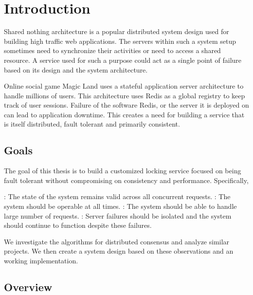\chapter{Introduction}
\label{chapter:introduction}

Shared nothing architecture%
 \citep{Stonebraker86g} is a popular distributed system design used for
building high traffic web applications. The servers within such a system setup
sometimes need to synchronize their activities or need to access a shared
resource. A service used for such a purpose could act as a single point of
failure based on its design and the system architecture.

Online social game Magic Land uses a stateful application server architecture to
handle millions of users. This architecture uses Redis as a global registry to
keep track of user sessions. Failure of the software Redis, or the server it
is deployed on can lead to application downtime. This creates a need for
building a service that is itself distributed, fault tolerant and primarily
consistent.

\section{Goals}

The goal of this thesis is to build a customized locking service focused on
being fault tolerant without compromising on consistency and performance.
Specifically,

\begin{itemize}
    : The state of the system remains valid across
    all concurrent requests.
    : The system should be operable at all times.
    : The system should be able to handle large number of
    requests.
    : Server failures should be isolated and the system
    should continue to function despite these failures.
\end{itemize}

We investigate the algorithms for distributed consensus and analyze similar
projects. We then create a system design based on these observations and
an working implementation.

\section{Overview}

